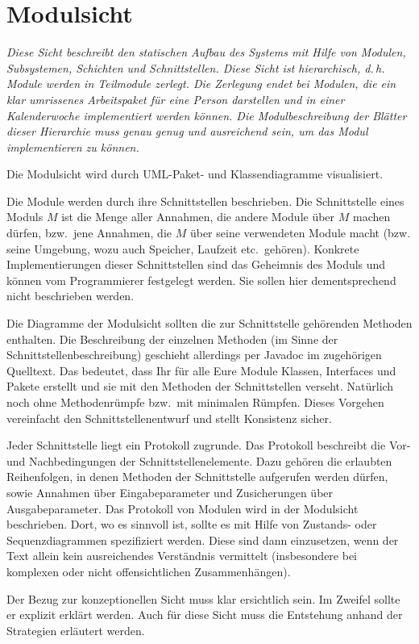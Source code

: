 \documentclass[fontsize=12pt,paper=a4,twoside]{scrartcl}
\begin{document}
\section{Modulsicht} \label{sec:modulsicht}
{\itshape Diese Sicht beschreibt den statischen Aufbau des Systems mit Hilfe von
Modulen, Subsystemen, Schichten und Schnittstellen. Diese Sicht ist 
hierarchisch, d.\,h. Module werden in Teilmodule zerlegt. Die Zerlegung endet 
bei Modulen, die ein klar umrissenes Arbeitspaket für eine Person darstellen und
in einer Kalenderwoche implementiert werden können. Die Modulbeschreibung der 
Blätter dieser Hierarchie muss genau genug und ausreichend sein, um das Modul 
implementieren zu können.

Die Modulsicht wird durch {UML}-Paket- und Klassendiagramme visualisiert.

Die Module werden durch ihre Schnittstellen beschrieben.
Die Schnittstelle eines Moduls $M$ ist die Menge aller Annahmen, die andere 
Module über $M$ machen dürfen, bzw.\ jene Annahmen, die $M$ über seine 
verwendeten Module macht (bzw. seine Umgebung, wozu auch Speicher, Laufzeit 
etc.\ gehören).
Konkrete Implementierungen dieser Schnittstellen sind das Geheimnis des Moduls
und können vom Programmierer festgelegt werden. Sie sollen hier dementsprechend 
nicht beschrieben werden. 

Die Diagramme der Modulsicht sollten die zur Schnittstelle gehörenden Methoden
enthalten. Die Beschreibung der einzelnen Methoden (im Sinne der 
Schnittstellenbeschreibung) geschieht allerdings per Javadoc im zugehörigen 
Quelltext. Das bedeutet, dass Ihr für alle Eure Module Klassen, Interfaces und 
Pakete erstellt und sie mit den Methoden der Schnittstellen verseht. Natürlich 
noch ohne Methodenrümpfe bzw.\ mit minimalen Rümpfen. Dieses Vorgehen 
vereinfacht den Schnittstellenentwurf und stellt Konsistenz sicher.

Jeder Schnittstelle liegt ein Protokoll zugrunde. Das Protokoll beschreibt die 
Vor- und Nachbedingungen der Schnittstellenelemente. Dazu gehören die erlaubten
Reihenfolgen, in denen Methoden der Schnittstelle aufgerufen werden dürfen, 
sowie Annahmen über Eingabeparameter und Zusicherungen über Ausgabeparameter. 
Das Protokoll von Modulen wird in der Modulsicht beschrieben.
Dort, wo es sinnvoll ist, sollte es mit Hilfe von Zustands- oder 
Sequenzdiagrammen spezifiziert werden. Diese sind dann einzusetzen, wenn der
Text allein kein ausreichendes Verständnis vermittelt (insbesondere bei 
komplexen oder nicht offensichtlichen Zusammenhängen).

Der Bezug zur konzeptionellen Sicht muss klar ersichtlich sein. Im Zweifel 
sollte er explizit erklärt werden. Auch für diese Sicht muss die Entstehung 
anhand der Strategien erläutert werden.}
\end{document}
